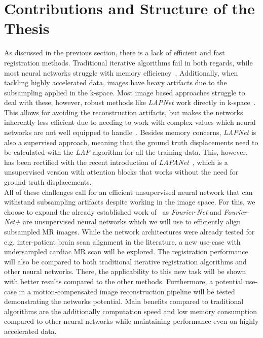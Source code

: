 \section{Contributions and Structure of the Thesis} \label{Sec:ContributionsAndStructure}
As discussed in the previous section, there is a lack of efficient and fast registration methods. Traditional iterative algorithms fail in both regards, while most neural networks struggle with memory efficiency~\cite{Fourier-Net,Fourier-Net+}. Additionally, when tackling highly accelerated data, images have heavy artifacts due to the subsampling applied in the k-space. Most image based approaches struggle to deal with these, however, robust methods like \emph{LAPNet} work directly in k-space~\cite{LAPNet}. This allows for avoiding the reconstruction artifacts, but makes the networks inherently less efficient due to needing to work with complex values which neural networks are not well equipped to handle~\cite{Trabelsi2017}. Besides memory concerns, \emph{LAPNet} is also a supervised approach, meaning that the ground truth displacements need to be calculated with the \emph{LAP} algorithm for all the training data. This, however, has been rectified with the recent introduction of \emph{LAPANet}~\cite{LAPANet}, which is a unsupervised version with attention blocks that works without the need for ground truth displacements.\\
All of these challenges call for an efficient unsupervised neural network that can withstand subsampling artifacts despite working in the image space. For this, we choose to expand the already established work of~\cite{Fourier-Net,Fourier-Net+} as \emph{Fourier-Net} and \emph{Fourier-Net+} are unsupervised neural networks which we will use to efficiently align subsampled MR images. While the network architectures were already tested for e.g. inter-patient brain scan alignment in the literature, a new use-case with undersampled cardiac MR scan will be explored. The registration performance will also be compared to both traditional iterative registration algorithms and other neural networks. There, the applicability to this new task will be shown with better results compared to the other methods. Furthermore, a potential use-case in a motion-compensated image reconstruction pipeline will be tested demonstrating the networks potential. Main benefits compared to traditional algorithms are the additionally computation speed and low memory consumption compared to other neural networks while maintaining performance even on highly accelerated data.\\
